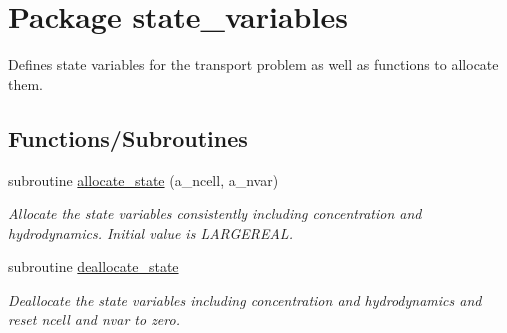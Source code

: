 \hypertarget{a00037}{
\section{Package state\_\-variables}
\label{a00037}
}
Defines state variables for the transport problem as well as functions to allocate them.  


\subsection*{Functions/Subroutines}
\begin{CompactItemize}
\item 
subroutine \hyperlink{a00037_02b466d6d8eb478ddb781a15f2d9c6d8}{allocate\_\-state} (a\_\-ncell, a\_\-nvar)
\begin{CompactList}\small\item\em Allocate the state variables consistently including concentration and hydrodynamics. Initial value is LARGEREAL. \item\end{CompactList}\item 
\hypertarget{a00037_727b2297ee7c0a3753d479272028937a}{
subroutine \hyperlink{a00037_727b2297ee7c0a3753d479272028937a}{deallocate\_\-state}}
\label{a00037_727b2297ee7c0a3753d479272028937a}

\begin{CompactList}\small\item\em Deallocate the state variables including concentration and hydrodynamics and reset ncell and nvar to zero. \item\end{CompactList}\end{CompactItemize}
